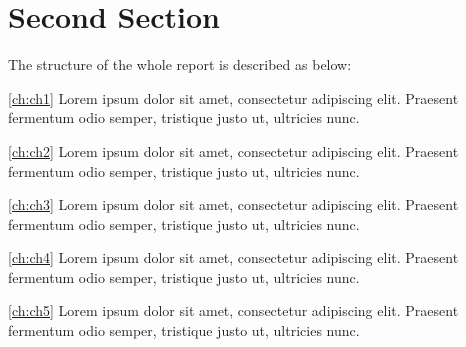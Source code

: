 \par\section{Second Section}
\par\noindent The structure of the whole report is described as below:
\par\noindent \autoref{ch:ch1} Lorem ipsum dolor sit amet, consectetur adipiscing elit. Praesent fermentum odio semper, tristique justo ut, ultricies nunc. 
\par\noindent \autoref{ch:ch2} Lorem ipsum dolor sit amet, consectetur adipiscing elit. Praesent fermentum odio semper, tristique justo ut, ultricies nunc. 
\par\noindent \autoref{ch:ch3} Lorem ipsum dolor sit amet, consectetur adipiscing elit. Praesent fermentum odio semper, tristique justo ut, ultricies nunc. 
\par\noindent \autoref{ch:ch4} Lorem ipsum dolor sit amet, consectetur adipiscing elit. Praesent fermentum odio semper, tristique justo ut, ultricies nunc. 
\par\noindent \autoref{ch:ch5} Lorem ipsum dolor sit amet, consectetur adipiscing elit. Praesent fermentum odio semper, tristique justo ut, ultricies nunc. 